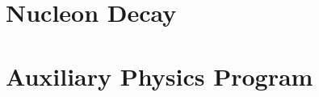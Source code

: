 
\section{Nucleon Decay}
\label{sec:exec-summ-physics-pdk}


\section{Auxiliary Physics Program}
\label{sec:exec-summ-physics-aux}




